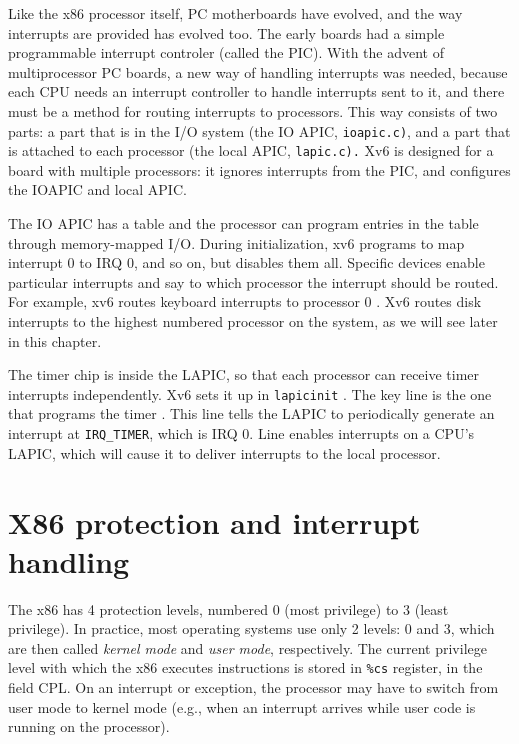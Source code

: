 Like the x86 processor itself, PC motherboards have evolved, and the
way interrupts are provided has evolved too.  The early boards had a
simple programmable interrupt controler (called the PIC).
With the advent of multiprocessor PC boards, a new way of handling
interrupts was needed, because each CPU needs an interrupt controller
to handle interrupts sent to it, and there must be a method for
routing interrupts to processors.  This way consists of two parts: a
part that is in the I/O system (the IO APIC,
\lstinline{ioapic.c)}, 
and a part that is attached to each processor (the
local APIC, 
\lstinline{lapic.c).}
Xv6 is designed for a
board with multiple processors: it ignores interrupts from the PIC, and
configures the IOAPIC and local APIC.

The IO APIC has a table and the processor can program entries in the
table through memory-mapped I/O.
During initialization, xv6 programs to map interrupt 0 to IRQ 0, and
so on, but disables them all.  Specific devices enable particular
interrupts and say to which processor the interrupt should be routed.
For example, xv6 routes keyboard interrupts to processor 0
.
Xv6 routes disk interrupts to the highest numbered processor on the
system, as we will see later in this chapter.

The timer chip is inside the LAPIC, so that each processor can receive
timer interrupts independently. Xv6 sets it up in
\lstinline{lapicinit}
.
The key line is the one that programs the timer
.
This line tells the LAPIC to periodically generate an interrupt at
\lstinline{IRQ_TIMER},
which is IRQ 0.
Line
enables interrupts on a CPU's LAPIC, which will cause it to deliver
interrupts to the local processor.
\section{X86 protection and interrupt handling}

The x86 has 4 protection levels, numbered 0 (most privilege) to 3
(least privilege).  In practice, most operating systems use only 2
levels: 0 and 3, which are then called 
\textit{kernel mode} 
and 
\textit{user mode},
respectively.  The current privilege level with which the x86 executes
instructions is stored in
\texttt{\%cs}
register, in the field CPL.  On an interrupt or exception, the processor may
have to switch from user mode to kernel mode (e.g., when an interrupt arrives
while user code is running on the processor).

